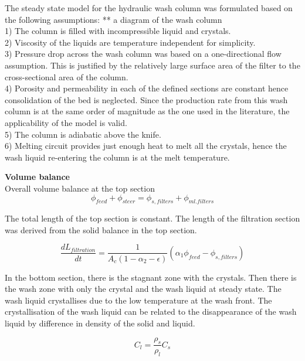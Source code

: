 The steady state model for the hydraulic wash column was formulated based on the following assumptions:
** a diagram of the wash column
\\ 1) The column is filled with incompressible liquid and crystals. 
\\ 2) Viscosity of the liquids are temperature independent for simplicity. 
\\ 3) Pressure drop across the wash column was based on a one-directional flow assumption. This is justified by the relatively large surface area of the filter to the cross-sectional area of the column. 
\\ 4) Porosity and permeability in each of the defined sections are constant hence consolidation of the bed is neglected. Since the production rate from this wash column is at the same order of magnitude as the one used in the literature, the applicability of the model is valid. 
\\ 5) The column is adiabatic above the knife.
\\ 6) Melting circuit provides just enough heat to melt all the crystals, hence the wash liquid re-entering the column is at the melt temperature. 

\textbf{Volume balance} 
\\Overall volume balance at the top section 
\begin{equation}
\phi_{feed}+\phi_{steer}=\phi_{s,filters}+\phi_{ml.filters}
\end{equation}

The total length of the top section is constant. The length of the filtration section was derived from the solid balance in the top section. 

\begin{equation}
\frac{dL_{filtration}}{dt} = \frac{1}{A_c(1-\alpha_2-\epsilon)}(\alpha_1\phi_{feed}-\phi_{s,filters})
\end{equation}

In the bottom section, there is the stagnant zone with the crystals. Then there is the wash zone with only the crystal and the wash liquid at steady state. The wash liquid crystallises due to the low temperature at the wash front. The crystallisation of the wash liquid can be related to the disappearance of the wash liquid by difference in density of the solid and liquid.

\begin{equation}
C_l= \frac{\rho_s}{\rho_l}C_s
\end{equation}

